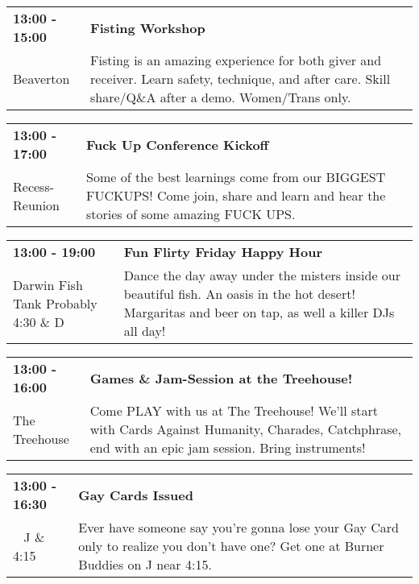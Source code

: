 \begin{tabular}{ p{1in} p{2.2in} }
    \textbf{13:00 - 15:00} & \textbf{Fisting Workshop} \\
    Beaverton \newline  & Fisting is an amazing experience for both giver and receiver. Learn safety, technique, and after care. Skill share/Q\&A after a demo. Women/Trans only. \\
    \hline 
\end{tabular}
    
\begin{tabular}{ p{1in} p{2.2in} }
    \textbf{13:00 - 17:00} & \textbf{Fuck Up Conference Kickoff} \\
    Recess-Reunion \newline  & Some of the best learnings come from our BIGGEST FUCKUPS!  Come join, share and learn and hear the stories of some amazing FUCK UPS. \\
    \hline 
\end{tabular}
    
\begin{tabular}{ p{1in} p{2.2in} }
    \textbf{13:00 - 19:00} & \textbf{Fun Flirty Friday Happy Hour} \\
    Darwin Fish Tank \newline Probably 4:30 \& D & Dance the day away under the misters inside our beautiful fish. An oasis in the hot desert!  Margaritas and beer on tap, as well a killer DJs all day! \\
    \hline 
\end{tabular}
    
\begin{tabular}{ p{1in} p{2.2in} }
    \textbf{13:00 - 16:00} & \textbf{Games \& Jam-Session at the Treehouse!} \\
    The Treehouse \newline  & Come PLAY with us at The Treehouse! We'll start with Cards Against Humanity, Charades, Catchphrase, end with an epic jam session. Bring instruments! \\
    \hline 
\end{tabular}
    
\begin{tabular}{ p{1in} p{2.2in} }
    \textbf{13:00 - 16:30} & \textbf{Gay Cards Issued} \\
    ~ \newline J \& 4:15 & Ever have someone say you're gonna lose your Gay Card only to realize you don't have one?  Get one at Burner Buddies on J near 4:15. \\
    \hline 
\end{tabular}
    
